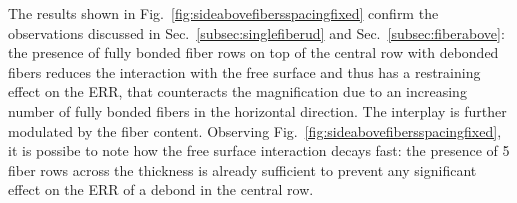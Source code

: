 \documentclass[review]{elsarticle}
\begin{document}
The results shown in Fig.~\ref{fig:sideabovefibersspacingfixed} confirm the observations discussed in Sec.~\ref{subsec:singlefiberud} and Sec.~\ref{subsec:fiberabove}: the presence of fully bonded fiber rows on top of the central row with debonded fibers reduces the interaction with the free surface and thus has a restraining effect on the ERR, that counteracts the magnification due to an increasing number of fully bonded fibers in the horizontal direction. The interplay is further modulated by the fiber content. Observing Fig.~\ref{fig:sideabovefibersspacingfixed}, it is possibe to note how the free surface interaction decays fast: the presence of 5 fiber rows across the thickness is already sufficient to prevent any significant effect on the ERR of a debond in the central row.

\end{document}
